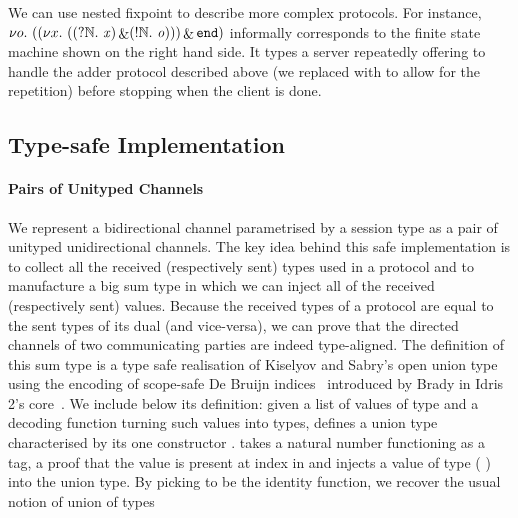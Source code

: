 \documentclass{easychair}
\begin{document}
We can use nested fixpoint to describe more complex
protocols. For instance,
$
\nu o.~(
  (\nu x.~((?\mathbb{N}.~\mathit{x}) \mathop{\&} (!\mathbb{N}.~\mathit{o}))
  ) \mathop{\&} \mathtt{end})
$
informally corresponds to the finite state machine
shown on the right hand side.
It types a server repeatedly offering to handle the adder
protocol described above (we replaced \stopsesh{} with
 to allow for the repetition) before stopping
when the client is done.


\subsection*{Type-safe Implementation}

\paragraph{Pairs of Unityped Channels}
We represent a bidirectional channel parametrised by a session
type as a pair of unityped unidirectional channels.
%
The key idea behind this safe implementation is to collect
all the received (respectively sent) types used in a protocol
and to manufacture a big sum type in which we can inject all
of the received (respectively sent) values.
%
Because the received types of a protocol are equal to the sent
types of its dual (and vice-versa), we can prove that the directed
channels of two communicating parties are indeed type-aligned.
%
The definition of this sum type is a type safe realisation of
Kiselyov and Sabry's open union type~\cite{DBLP:conf/haskell/KiselyovSS13}
using the encoding of scope-safe
De Bruijn indices~\cite{MANUAL:journals/math/debruijn72}
introduced by Brady in Idris 2's core~\cite{DBLP:conf/ecoop/Brady21}.
%
We include below its definition: given
a list  of values of type 
and a decoding function  turning such values into types,
 defines a union type characterised by its one
constructor .
 takes a natural number  functioning as a tag,
a proof that the value  is present at index 
in  and injects a value of type ( )
into the union type.
%
By picking  to be the identity function, we recover the
usual notion of union of types

\end{document}
